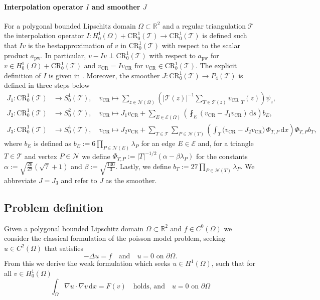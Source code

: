\documentclass[11pt,a4paper]{article}
\newcommand{\vCR}{v_{\mathrm{CR}}}
\newcommand{\dx}{\,\mathrm{d}x}
\newcommand{\ds}{\,\mathrm{d}s}
\newcommand{\CR}{\mathrm{CR}^1_0(\mathcal{T})}
\begin{document}
\paragraph{Interpolation operator \(I\) and smoother \(J\)}
For a polygonal bounded Lipschitz domain \(\Omega \subset \mathbb{R}^2\) and a regular triangulation \(\mathcal{T}\) the interpolation operator \(I : H^1_0(\Omega) + \CR \rightarrow \CR\) is defined such that \(Iv\) is the bestapproximation of \(v\) in \(\mathrm{CR}^1_0(\mathcal{T})\) with respect to the scalar product \(a_{\mathrm{pw}}\). In particular, \(v - Iv \perp \mathrm{CR}^1_0(\mathcal{T})\) with respect to \(a_{\mathrm{pw}}\) for  \(v \in H^1_0(\Omega) + \CR\) and \(\vCR = I\vCR\) for \(\vCR \in \CR\). The explicit definition of \(I\) is given in \cite[p. 61]{Puttkammer2023}. Moreover, the smoother \(J: \mathrm{CR}^1_0(\mathcal{T}) \rightarrow P_4(\mathcal{T})\) is defined in three steps below
\begin{align}
J_1 : \CR &\rightarrow S^1_0(\mathcal{T}), \quad
\vCR \mapsto \sum_{z \in \mathcal{N}(\Omega)} \left( |\mathcal{T}(z)|^{-1} \sum_{T \in \mathcal{T}(z)} {\vCR|_T(z)} \right) \psi_z, \label{definition J1} \\
J_2: \CR &\rightarrow S^2_0(\mathcal{T}), \quad \vCR \mapsto J_1 \vCR + \sum_{E \in \mathcal{E}(\Omega)} \left(\fint_{E} \left( \vCR - J_{1} \vCR \right) \ds \right) b_E, \label{definition J2}\\
J_3: \CR &\rightarrow S^4_0(\mathcal{T}), \quad \vCR \mapsto J_2 \vCR
+ \sum_{T \in \mathcal{T}} \sum_{P \in \mathcal{N}(T)}
\left(\int_T \bigl( \vCR - J_2 \vCR \bigr)\, \Phi_{T,P} \dx \right) \Phi_{T,P} b_T, \label{definition J3}
\end{align}
where \(b_E\) is defined as \(b_E := 6 \prod_{P \in \mathcal{N}(E)} \lambda_P\) for an edge \(E \in \mathcal{E}\) and, for a triangle \(T \in \mathcal{T}\) and vertex \(P \in \mathcal{N}\) we  define \(\Phi_{T,P} := |T|^{-1/2} (\alpha - \beta \lambda_P)\) for the constants \(\alpha := \sqrt{\frac{20}{27}} (\sqrt{7}+1)\) and \(\beta := \sqrt{\frac{140}{3}}\). Lastly, we define \(b_T := 27\prod_{P \in \mathcal{N}(T)} \lambda_P\). We abbreviate \(J = J_3\) and refer to \(J\) as the smoother.

\subsection{Problem definition}
\label{sec:introduction}
Given a polygonal bounded Lipschitz domain \(\Omega \subset \mathbb{R}^2\) and \(f \in C^0(\Omega) \) we consider the classical formulation of the poisson model problem, seeking \(u \in C^2(\Omega)\) that satisfies 
\[ -\Delta u = f \quad \text{and} \quad u = 0 \text{ on } \partial \Omega. \]
From this we derive the weak formulation which seeks \(u \in H^1(\Omega)\), such that for all \(v \in H^1_0(\Omega)\)
\begin{equation} \label{weak formulation PMP}
\int_\Omega \nabla u \cdot \nabla v \dx  = F(v) \quad \text{holds, and} \quad u = 0 \text{ on } \partial \Omega
\end{equation}
\end{document}
